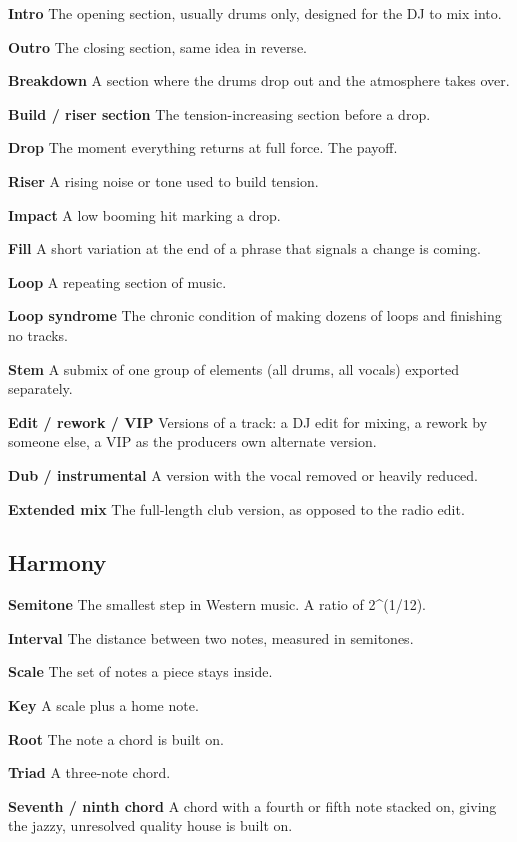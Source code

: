 \textbf{Intro} The opening section, usually drums only, designed for the DJ to mix into.

\textbf{Outro} The closing section, same idea in reverse.

\textbf{Breakdown} A section where the drums drop out and the atmosphere takes over.

\textbf{Build / riser section} The tension-increasing section before a drop.

\textbf{Drop} The moment everything returns at full force. The payoff.

\textbf{Riser} A rising noise or tone used to build tension.

\textbf{Impact} A low booming hit marking a drop.

\textbf{Fill} A short variation at the end of a phrase that signals a change is coming.

\textbf{Loop} A repeating section of music.

\textbf{Loop syndrome} The chronic condition of making dozens of loops and finishing no tracks.

\textbf{Stem} A submix of one group of elements (all drums, all vocals) exported separately.

\textbf{Edit / rework / VIP} Versions of a track: a DJ edit for mixing, a rework by someone else,
a VIP as the producer\textquotesingle s own alternate version.

\textbf{Dub / instrumental} A version with the vocal removed or heavily reduced.

\textbf{Extended mix} The full-length club version, as opposed to the radio edit.

\subsection{Harmony}\label{th09_glossary-harmony}

\textbf{Semitone} The smallest step in Western music. A ratio of 2\^{}(1/12).

\textbf{Interval} The distance between two notes, measured in semitones.

\textbf{Scale} The set of notes a piece stays inside.

\textbf{Key} A scale plus a home note.

\textbf{Root} The note a chord is built on.

\textbf{Triad} A three-note chord.

\textbf{Seventh / ninth chord} A chord with a fourth or fifth note stacked on, giving the jazzy,
unresolved quality house is built on.

